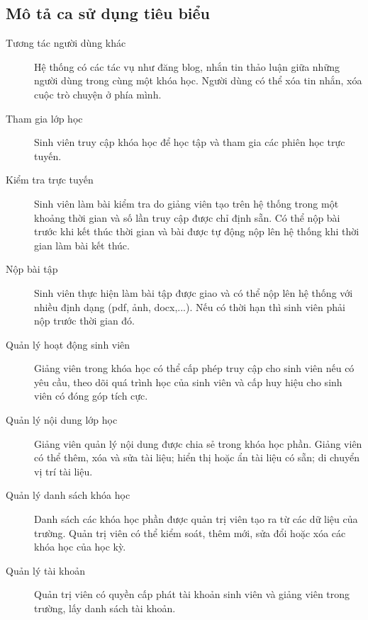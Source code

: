 \documentclass[./../main_file.tex]{subfiles}
\begin{document}
	\subsection{Mô tả ca sử dụng tiêu biểu}
	\begin{description}
		\item[Tương tác người dùng khác] Hệ thống có các tác vụ như đăng blog, nhắn tin thảo luận giữa những người dùng trong cùng một khóa học. Người dùng có thể xóa tin nhắn, xóa cuộc trò chuyện ở phía mình.
		\item[Tham gia lớp học] Sinh viên truy cập khóa học để học tập và tham gia các phiên học trực tuyến.
		\item[Kiểm tra trực tuyến] Sinh viên làm bài kiểm tra do giảng viên tạo trên hệ thống trong một khoảng thời gian và số lần truy cập được chỉ định sẵn. Có thể nộp bài trước khi kết thúc thời gian và bài được tự động nộp lên hệ thống khi thời gian làm bài kết thúc.
		\item[Nộp bài tập] Sinh viên thực hiện làm bài tập được giao và có thể nộp lên hệ thống với nhiều định dạng (pdf, ảnh, docx,...). Nếu có thời hạn thì sinh viên phải nộp trước thời gian đó.
		\item[Quản lý hoạt động sinh viên] Giảng viên trong khóa học có thể cấp phép truy cập cho sinh viên nếu có yêu cầu, theo dõi quá trình học của sinh viên và cấp huy hiệu cho sinh viên có đóng góp tích cực.
		\item[Quản lý nội dung lớp học] Giảng viên quản lý nội dung được chia sẻ trong khóa học phần. Giảng viên có thể thêm, xóa và sửa tài liệu; hiển thị hoặc ẩn tài liệu có sẵn; di chuyển vị trí tài liệu.
		\item[Quản lý danh sách khóa học] Danh sách các khóa học phần được quản trị viên tạo ra từ các dữ liệu của trường. Quản trị viên có thể kiểm soát, thêm mới, sửa đổi hoặc xóa các khóa học của học kỳ.
		\item[Quản lý tài khoản] Quản trị viên có quyền cấp phát tài khoản sinh viên và giảng viên trong trường, lấy danh sách tài khoản.
		
	\end{description}
\end{document}
